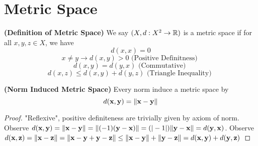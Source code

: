 \documentclass{report}
\begin{document}
\section{Metric Space}
\begin{definition}
\label{2.7.1}
\textbf{(Definition of Metric Space)} We say $(X,d:X^2\rightarrow \mathbb{R})$ is a metric space if for all $x,y,z \in X$, we have
\begin{equation}
d(x,x)=0 
\end{equation}
\begin{equation}
x\neq y\longrightarrow d(x,y)>0\text{ (Positive Definitness) }
\end{equation}
\begin{equation}
d(x,y)=d(y,x)\text{ (Commutative) }
\end{equation}
\begin{equation}
d(x,z)\leq d(x,y)+d(y,z)\text{ (Triangle Inequality) }
\end{equation}
\end{definition}
\begin{theorem}
\label{2.7.2}
\textbf{(Norm Induced Metric Space)} Every norm induce a metric space by 
\begin{equation}
d(\textbf{x},\textbf{y})=\| \textbf{x}-\textbf{y} \|
\end{equation}
\end{theorem}
\begin{proof}
"Reflexive", positive definiteness are trivially given by axiom of norm. Observe $d(\textbf{x},\textbf{y})=\| \textbf{x}-\textbf{y} \|=\| (-1)(\textbf{y}-\textbf{x}) \|=(|-1|)\| \textbf{y}-\textbf{x} \|=d(\textbf{y},\textbf{x})$. Observe $d(\textbf{x},\textbf{z})=\| \textbf{x}-\textbf{z} \|=\| \textbf{x}-\textbf{y}+\textbf{y}-\textbf{z} \|\leq \| \textbf{x}-\textbf{y} \|+\| \textbf{y}-\textbf{z} \|=d(\textbf{x},\textbf{y})+d(\textbf{y},\textbf{z})$
\end{proof}
\end{document}

